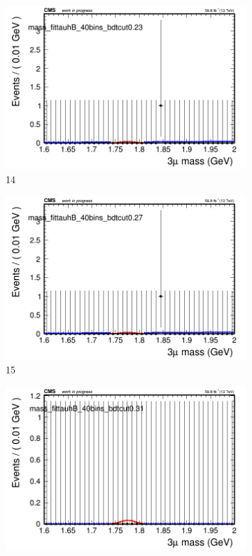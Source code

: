 \begin{figure}[h!]
\begin{subfigure}{0.2\textwidth}
        \includegraphics[width=\textwidth]{unfixed_exp/plots/tauhB/massfit_tauhB_40bins_bdtcut0.23.png}
        \caption{14}
    \end{subfigure}
    \begin{subfigure}{0.2\textwidth}
        \includegraphics[width=\textwidth]{unfixed_exp/plots/tauhB/massfit_tauhB_40bins_bdtcut0.27.png}
        \caption{15}
    \end{subfigure}
    \begin{subfigure}{0.2\textwidth}
        \includegraphics[width=\textwidth]{unfixed_exp/plots/tauhB/massfit_tauhB_40bins_bdtcut0.31.png}

\end{subfigure}
\end{figure}
